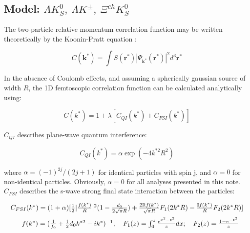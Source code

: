 \documentclass[../AnalysisNoteJBuxton.tex]{subfiles}
\begin{document}
\subsection{Model: \texorpdfstring{$\Lambda K^{0}_{S},~ \Lambda K^{\pm},~ \Xi^{ch}K^{0}_{S}$}{TEXT}}
\label{ModelLambdaKaon}

The two-particle relative momentum correlation function may be written theoretically by the Koonin-Pratt equation \cite{Koonin:1977fh, Pratt:1990zq}:

\begin{equation}
 C(\mathbf{k^{*}}) = \int S(\mathbf{r^{*}})|\Psi_{\mathbf{k^{*}}}(\mathbf{r^{*}})|^{2}d^{3}\mathbf{r^{*}}
\label{eqn:KooninPrattEqn}
\end{equation}

In the absence of Coulomb effects, and assuming a spherically gaussian source of width $R$, the 1D femtoscopic correlation function can be calculated analytically using:

\begin{equation}
 C(k^{*}) = 1 + \lambda[C_{QI}(k^{*}) + C_{FSI}(k^{*})]
\label{eqn:LednickyEqn}
\end{equation}

$C_{QI}$ describes plane-wave quantum interference:

\begin{equation}
 C_{QI}(k^{*}) = \alpha\exp(-4k^{*2}R^{2})
\label{eqn:CQI}
\end{equation}

where $\alpha = (-1)^{2j}/(2j+1)$ for identical particles with spin j, and $\alpha = 0$ for non-identical particles.  Obviously, $\alpha = 0$ for all analyses presented in this note.  $C_{FSI}$ describes the s-wave strong final state interaction between the particles:

\begin{equation}
\begin{array}{l}
\vspace{2mm}  %
  C_{FSI}(k^{*}) = (1+\alpha)[\frac{1}{2}|\frac{f(k^{*})}{R}|^2(1-\frac{d_{0}}{2\sqrt{\pi}R})+\frac{2\mathbb{R}f(k^{*})}{\sqrt{\pi}R}F_{1}(2k^{*}R)-\frac{\mathbb{I}f(k^{*})}{R}F_{2}(2k^{*}R)] \\
\vspace{2mm}  %
  ~~~~~f(k^{*}) = (\frac{1}{f_{0}}+\frac{1}{2}d_{0}k^{*2}-ik^{*})^{-1};~~~
  F_{1}(z) = \int_{0}^{z} \frac{e^{x^{2}-z^{2}}}{z}dx;~~~
  F_{2}(z) = \frac{1-e^{-z^{2}}}{z}
\end{array}  
\label{eqn:CFSI}
\end{equation}
\end{document}
